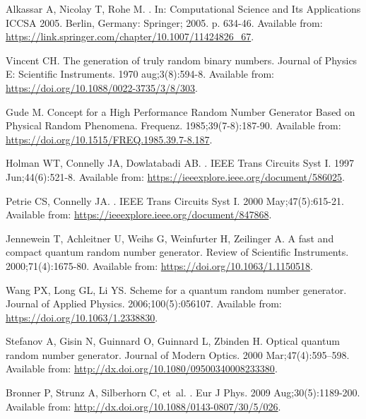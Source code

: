 \documentclass[]{interact}
\theoremstyle{plain}%
\theoremstyle{definition}
\theoremstyle{remark}
\begin{document}
\begin{thebibliography}{100}
Alkassar A, Nicolay T, Rohe M.
.
\newblock In: {Computational Science and Its Applications {\textendash} ICCSA
  2005}. Berlin, Germany: Springer; 2005. p. 634-46.
\newblock Available from:
  \url{https://link.springer.com/chapter/10.1007/11424826_67}.

Vincent CH.
\newblock The generation of truly random binary numbers.
\newblock Journal of Physics E: Scientific Instruments. 1970 aug;3(8):594-8.
\newblock Available from: \url{https://doi.org/10.1088/0022-3735/3/8/303}.

Gude M.
\newblock Concept for a High Performance Random Number Generator Based on
  Physical Random Phenomena.
\newblock Frequenz. 1985;39(7-8):187-90.
\newblock Available from: \url{https://doi.org/10.1515/FREQ.1985.39.7-8.187}.

Holman WT, Connelly JA, Dowlatabadi AB.
.
\newblock IEEE Trans Circuits Syst I. 1997 Jun;44(6):521-8.
\newblock Available from: \url{https://ieeexplore.ieee.org/document/586025}.

Petrie CS, Connelly JA.
.
\newblock IEEE Trans Circuits Syst I. 2000 May;47(5):615-21.
\newblock Available from: \url{https://ieeexplore.ieee.org/document/847868}.

Jennewein T, Achleitner U, Weihs G, Weinfurter H, Zeilinger A.
\newblock A fast and compact quantum random number generator.
\newblock Review of Scientific Instruments. 2000;71(4):1675-80.
\newblock Available from: \url{https://doi.org/10.1063/1.1150518}.

Wang PX, Long GL, Li YS.
\newblock Scheme for a quantum random number generator.
\newblock Journal of Applied Physics. 2006;100(5):056107.
\newblock Available from: \url{https://doi.org/10.1063/1.2338830}.

Stefanov A, Gisin N, Guinnard O, Guinnard L, Zbinden H.
\newblock Optical quantum random number generator.
\newblock Journal of Modern Optics. 2000 Mar;47(4):595–598.
\newblock Available from: \url{http://dx.doi.org/10.1080/09500340008233380}.

Bronner P, Strunz A, Silberhorn C, et~al.
.
\newblock Eur J Phys. 2009 Aug;30(5):1189-200.
\newblock Available from: \url{http://dx.doi.org/10.1088/0143-0807/30/5/026}.


\end{thebibliography}
\end{document}
